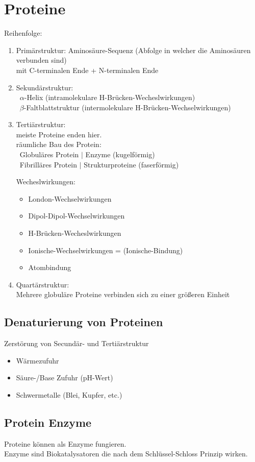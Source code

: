\section{Proteine}
Reihenfolge:
\begin{enumerate}
    \item Primärstruktur: 
        Aminosäure-Sequenz (Abfolge in welcher die Aminosäuren verbunden sind) \\
        mit C-terminalen Ende + N-terminalen Ende
    \item Sekundärstruktur: \\
        \textrightarrow\ $\alpha$-Helix (intramolekulare H-Brücken-Wecheslwirkungen)\\
        \textrightarrow\ $\beta$-Faltblattstruktur (intermolekulare H-Brücken-Wechselwirkungen)
    \item Tertiärstruktur: \\
        meiste Proteine enden hier. \\
        räumliche Bau des Protein: \\
        \textrightarrow\ Globuläres Protein $|$ Enzyme (kugelförmig) \\
        \textrightarrow\ Fibrilläres Protein $|$ Strukturproteine (faserförmig)

        Wecheslwirkungen: 
        \begin{itemize}
            \item London-Wechselwirkungen
            \item Dipol-Dipol-Wechselwirkungen
            \item H-Brücken-Wecheslwirkungen
            \item Ionische-Wechselwirkungen = (Ionische-Bindung)
            \item Atombindung
        \end{itemize}
    \item Quartärstruktur: \\
        Mehrere globuläre Proteine verbinden sich zu einer größeren Einheit
\end{enumerate}


\subsection{Denaturierung von Proteinen}
Zerstörung von Secundär- und Tertiärstruktur
\begin{itemize}
    \item Wärmezufuhr
    \item Säure-/Base Zufuhr (pH-Wert)
    \item Schwermetalle (Blei, Kupfer, etc.)
\end{itemize}


\subsection{Protein Enzyme}
Proteine können als Enzyme fungieren. \\
Enzyme sind Biokatalysatoren die nach dem Schlüssel-Schloss Prinzip wirken.
